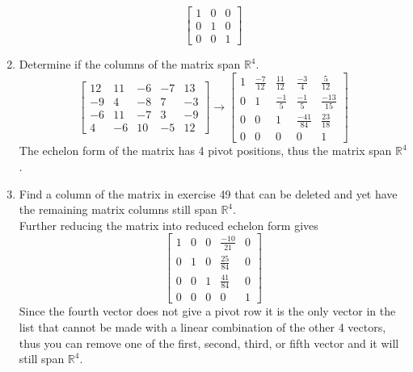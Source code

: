 \documentclass[12pt]{article}
\newcommand\setitemnumber[1]{\setcounter{enumi}{\numexpr#1-- -1\relax}}
\begin{document}
\begin{enumerate}[label=\textbf{\arabic*.}]
    \[
      \begin{bmatrix}
        1 & 0 & 0 \\
        0 & 1 & 0 \\
        0 & 0 & 1
      \end{bmatrix}  
    \]
    \setitemnumber{49}
    \item Determine if the columns of the matrix span $\mathbb{R}^4$.
    \[
      \begin{bmatrix}
        12 & 11 & -6 & -7 & 13 \\
        -9 & 4 & -8 & 7 & -3 \\
        -6 & 11 & -7 & 3 & -9 \\
        4 & -6 & 10 & -5 & 12
      \end{bmatrix} 
      \rightarrow \begin{bmatrix}
        1 & \frac{-7}{12} & \frac{11}{12} & \frac{-3}{4} & \frac{5}{12} \\
        0 & 1 & \frac{-1}{5} & \frac{-1}{5} & \frac{-13}{15} \\
        0 & 0 & 1 & \frac{-41}{84} & \frac{23}{18} \\
        0 & 0 & 0 & 0 & 1
      \end{bmatrix}
    \]
    The echelon form of the matrix has 4 pivot positions, thus the matrix span $\mathbb{R}^4$.
    \setitemnumber{51}
    \item Find a column of the matrix in exercise 49 that can be deleted and yet have the 
    remaining matrix columns still span $\mathbb{R}^4$. \\
    Further reducing the matrix into reduced echelon form gives 
    \[
      \begin{bmatrix}
        1 & 0 & 0 & \frac{-10}{21}& 0 \\
        0 & 1 & 0 & \frac{25}{84} & 0\\
        0 & 0 & 1 & \frac{41}{84} & 0\\
        0 & 0 & 0 & 0 &  1
      \end{bmatrix}  
    \]
    Since the fourth vector does not give a pivot row it is the only vector in the list that 
    cannot be made with a linear combination of the other 4 vectors, thus you can 
    remove one of the first, second, third, or fifth vector and it will still span $\mathbb{R}^4$.
\end{enumerate}
\end{document}
